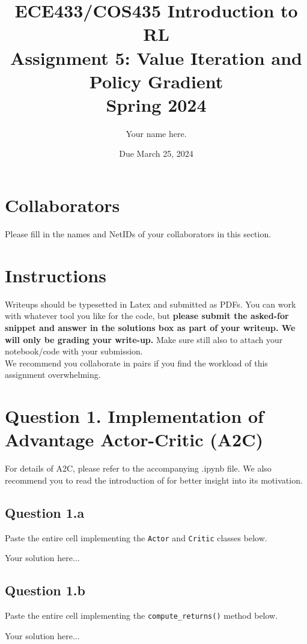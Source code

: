 \documentclass[12pt]{article}
\date{Due March 25, 2024}
\author{\begin{fillme}[width=0.3\textwidth]
 Your name here.
\end{fillme}} %
\title{ECE433/COS435 Introduction to RL\\
  Assignment 5: Value Iteration and Policy Gradient\\
  Spring 2024\\
}
\begin{document}
  \maketitle
  \section*{Collaborators}
\begin{fillme}
 Please fill in the names and NetIDs of your collaborators in this section.
\end{fillme}

\section*{Instructions}

Writeups should be typesetted in Latex and submitted as PDFs. You can work with whatever tool you like for the code, but \textbf{please submit the asked-for snippet and answer in the solutions box as part of your writeup. We will only be grading your write-up.} Make sure still also to attach your notebook/code with your submission.\\


\noindent We recommend you collaborate in pairs if you find the workload of this assignment overwhelming.

\section*{Question 1. Implementation of Advantage Actor-Critic (A2C)}
For details of A2C, please refer to the accompanying .ipynb file. We also recommend you to read the introduction of  \cite{lillicrap2019continuous} for better insight into its motivation.
\subsection*{Question 1.a}
Paste the entire cell implementing the \texttt{Actor} and \texttt{Critic} classes below. 
\begin{solution}
Your solution here...
\end{solution}

\subsection*{Question 1.b}
Paste the entire cell implementing the \texttt{compute\_returns()} method below.
\begin{solution}
Your solution here...
\end{solution}
\end{document}

